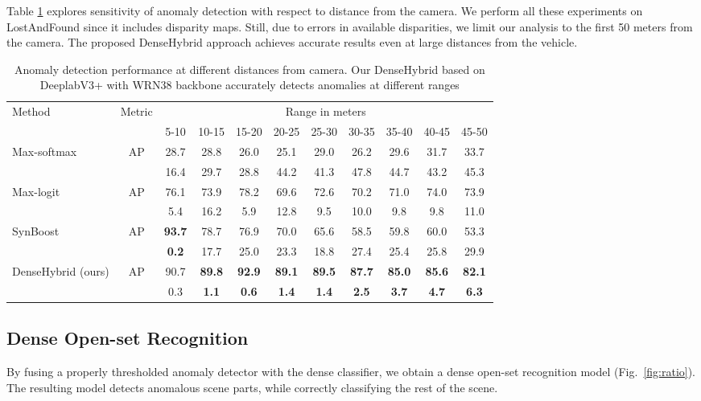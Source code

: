 \documentclass[runningheads]{llncs}
\begin{document}
Table \ref{tbl:distance} explores sensitivity of anomaly detection with respect to distance from the camera.
We perform all these experiments on LostAndFound since it includes disparity maps.
Still, due to errors in available disparities, we limit our analysis to the first 50 meters from the camera.
The proposed DenseHybrid approach achieves accurate results even at large distances from the vehicle.


\begin{table}[h]
\begin{center}
\caption{Anomaly detection performance at different distances from camera.
Our DenseHybrid based on DeeplabV3+ with WRN38 backbone \cite{zhu19cvpr} accurately detects anomalies at different ranges}
\label{tbl:distance}
\begin{tabular}{lcccccccccc}
\hline \hline
 \multirow{2}{*}{Method}& \multirow{2}{*}{Metric}  & \multicolumn{9}{|c}{Range in meters} \\
 &  & \multicolumn{1}{|c}{5-10} & 10-15 & 15-20 & 20-25 & 25-30 & 30-35 & 35-40 & 40-45 & 45-50 \\ \hline \hline
 \multirow{2}{*}{Max-softmax \cite{hendrycks17iclr}} & AP & 28.7 & 28.8 & 26.0 & 25.1 & 29.0 & 26.2 & 29.6 & 31.7 & 33.7\\
&   & 16.4 & 29.7 & 28.8 &44.2 & 41.3 & 47.8 & 44.7 & 43.2 & 45.3 \\ \hline
 \multirow{2}{*}{Max-logit \cite{hendrycks19arxiv}} & AP & 76.1 & 73.9 & 78.2 & 69.6 & 72.6 & 70.2 & 71.0 & 74.0 & 73.9\\
&   & 5.4 & 16.2 & 5.9 & 12.8 & 9.5 & 10.0 & 9.8 & 9.8 & 11.0 \\ \hline
\multirow{2}{*}{SynBoost \cite{biase21cvpr}} & AP & \textbf{93.7} & 78.7 & 76.9 & 70.0 & 65.6 & 58.5 & 59.8 & 60.0 & 53.3\\
 &  & \textbf{0.2} & 17.7 & 25.0 & 23.3 &18.8  & 27.4  & 25.4 &25.8  & 29.9 \\ \hline
 \multirow{2}{*}{DenseHybrid (ours)}& AP & 90.7 & \textbf{89.8} & \textbf{92.9} & \textbf{89.1} & \textbf{89.5} & \textbf{87.7} & \textbf{85.0} & \textbf{85.6} & \textbf{82.1} \\
&  & 0.3 & \textbf{1.1} & \textbf{0.6} & \textbf{1.4} & \textbf{1.4} & \textbf{2.5} & \textbf{3.7} & \textbf{4.7} & \textbf{6.3} \\\hline
\end{tabular}
\end{center}
\end{table}

\subsection{Dense Open-set Recognition}
\label{sec:res_rec}
By fusing a properly thresholded anomaly detector with the dense classifier, we obtain a dense open-set recognition model (Fig.\ \ref{fig:ratio}).
The resulting model detects anomalous scene parts, while correctly classifying the rest of the scene.
\end{document}
